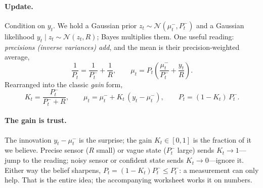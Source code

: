 \documentclass[11pt]{article}
\theoremstyle{plain}
\theoremstyle{definition}
\theoremstyle{remark}
\theoremstyle{definition}
\newcommand{\Normal}{\mathcal{N}}
\begin{document}
\paragraph{Update.} Condition on $y_t$. We hold a Gaussian prior
$z_t \sim \Normal(\mu_t^-, P_t^-)$ and a Gaussian likelihood
$y_t \mid z_t \sim \Normal(z_t, R)$; Bayes multiplies them. One useful reading:
\emph{precisions (inverse variances) add}, and the mean is their precision-weighted
average,
\begin{equation}\label{eq:kf-bayes}
  \frac{1}{P_t} = \frac{1}{P_t^-} + \frac{1}{R},
  \qquad
  \mu_t = P_t\!\left(\frac{\mu_t^-}{P_t^-} + \frac{y_t}{R}\right).
\end{equation}
Rearranged into the classic \emph{gain} form,
\begin{equation}\label{eq:kf-update}
  K_t = \frac{P_t^-}{P_t^- + R},
  \qquad
  \mu_t = \mu_t^- + K_t\,(y_t - \mu_t^-),
  \qquad
  P_t = (1 - K_t)\,P_t^-.
\end{equation}

\paragraph{The gain is trust.} The innovation $y_t - \mu_t^-$ is the surprise;
the gain $K_t \in [0,1]$ is the fraction of it we believe. Precise sensor ($R$
small) or vague state ($P_t^-$ large) sends $K_t \to 1$---jump to the reading;
noisy sensor or confident state sends $K_t \to 0$---ignore it. Either way the
belief sharpens, $P_t = (1-K_t)P_t^- \le P_t^-$: a measurement can only help. That
is the entire idea; the accompanying worksheet works it on numbers.
\end{document}
